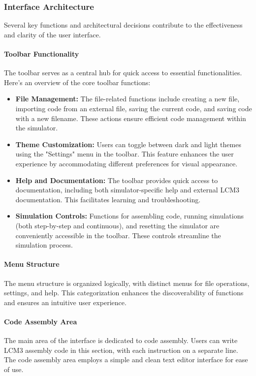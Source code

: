 \documentclass{article}
\begin{document}
\subsubsection{Interface Architecture}

Several key functions and architectural decisions contribute to the effectiveness and clarity of the user interface.
\paragraph{Toolbar Functionality}
The toolbar serves as a central hub for quick access to essential functionalities. Here's an overview of the core toolbar functions:
\begin{itemize}
  \item \textbf{File Management:} The file-related functions include creating a new file, importing code from an external file, saving the current code, and saving code with a new filename. These actions ensure efficient code management within the simulator.

  \item \textbf{Theme Customization:} Users can toggle between dark and light themes using the "Settings" menu in the toolbar. This feature enhances the user experience by accommodating different preferences for visual appearance.

  \item \textbf{Help and Documentation:} The toolbar provides quick access to documentation, including both simulator-specific help and external LCM3 documentation. This facilitates learning and troubleshooting.

  \item \textbf{Simulation Controls:} Functions for assembling code, running simulations (both step-by-step and continuous), and resetting the simulator are conveniently accessible in the toolbar. These controls streamline the simulation process.
\end{itemize}

\paragraph{Menu Structure}
The menu structure is organized logically, with distinct menus for file operations, settings, and help. This categorization enhances the discoverability of functions and ensures an intuitive user experience.

\paragraph{Code Assembly Area}
The main area of the interface is dedicated to code assembly. Users can write LCM3 assembly code in this section, with each instruction on a separate line. The code assembly area employs a simple and clean text editor interface for ease of use.
\end{document}
